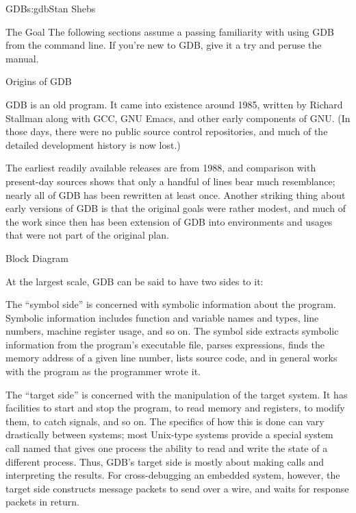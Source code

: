 \begin{aosachapter}{GDB}{s:gdb}{Stan Shebs}
\begin{aosasect1}{The Goal}
The following sections assume a passing familiarity with using GDB
from the command line. If you're new to GDB, give it a try and peruse
the manual.\cite{bib:gdb-manual}

\end{aosasect1}

\begin{aosasect1}{Origins of GDB}

GDB is an old program.  It came into existence around 1985, written by
Richard Stallman along with GCC, GNU Emacs, and other early components
of GNU.  (In those days, there were no public source control
repositories, and much of the detailed development history is now
lost.)

The earliest readily available releases are from 1988, and comparison
with present-day sources shows that only a handful of lines bear much
resemblance; nearly all of GDB has been rewritten at least once.
Another striking thing about early versions of GDB is that the
original goals were rather modest, and much of the work since then has
been extension of GDB into environments and usages that were not part
of the original plan.

\end{aosasect1}

\begin{aosasect1}{Block Diagram}


At the largest scale, GDB can be said to have two sides to it:

\begin{aosaenumerate}
\item The ``symbol side'' is concerned with symbolic information about
the program.  Symbolic information includes function and variable
names and types, line numbers, machine register usage, and so on.
The symbol side extracts symbolic information from the program's
executable file, parses expressions, finds the memory address of a
given line number, lists source code, and in general works with
the program as the programmer wrote it.

\item The ``target side'' is concerned with the manipulation of the
target system.  It has facilities to start and stop the program, to
read memory and registers, to modify them, to catch signals, and so
on.  The specifics of how this is done can vary drastically between
systems; most Unix-type systems provide a special system call named
 that gives one process the ability to read and write the
state of a different process. Thus, GDB's target side is
mostly about making  calls and interpreting the results.
For cross-debugging an embedded system, however, the target side constructs
message packets to send over a wire, and waits for response packets in
return.
\end{aosaenumerate}


\end{aosasect1}
\end{aosachapter}
